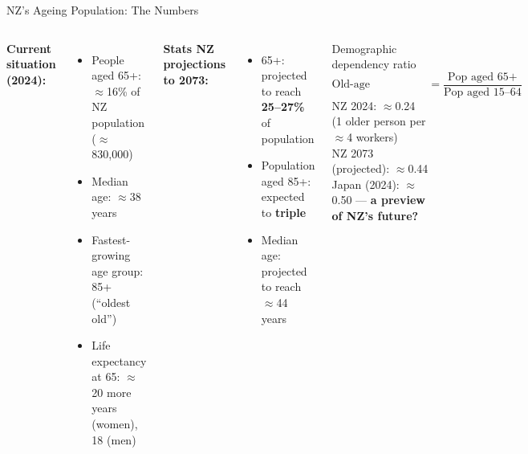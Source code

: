 \documentclass[aspectratio=169, 12pt]{beamer}
\begin{document}
\begin{frame}{NZ's Ageing Population: The Numbers}
  \begin{columns}
      \textbf{Current situation (2024):}
      \begin{itemize}
        \item People aged 65+: $\approx$16\% of NZ population ($\approx$830,000)
        \item Median age: $\approx$38 years
        \item Fastest-growing age group: 85+ (``oldest old'')
        \item Life expectancy at 65: $\approx$20 more years (women), 18 (men)
      \end{itemize}
      \vspace{0.4em}
      \textbf{Stats NZ projections to 2073:}
      \begin{itemize}
        \item 65+: projected to reach \textbf{25--27\%} of population
        \item Population aged 85+: expected to \textbf{triple}
        \item Median age: projected to reach $\approx$44 years
      \end{itemize}
      \begin{alertblock}{Demographic dependency ratio}
        $$\text{Old-age dependency ratio} = \frac{\text{Pop aged 65+}}{\text{Pop aged 15--64}}$$
        NZ 2024: $\approx$0.24 (1 older person per $\approx$4 workers)\\
        NZ 2073 (projected): $\approx$0.44\\[0.3em]
        Japan (2024): $\approx$0.50 --- \textbf{a preview of NZ's future?}
      \end{alertblock}
  \end{columns}
\end{frame}
\end{document}
